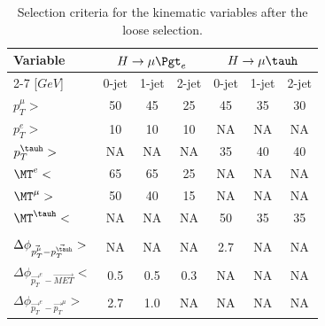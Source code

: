 \begin{table}[hbtp]
 \centering
 \caption{Selection criteria for the kinematic variables after the loose selection.}
  \label{tab:kinematicselection}
   \begin{tabular}{lccc|ccc} \hline
Variable &\multicolumn{3}{c|}{$H\rightarrow\mu\Pgt_{e}$ }                 &     \multicolumn{3}{c}{$H \rightarrow \mu \tauh$}
 \\ \cline{2-7}
      [$GeV$]                                   &  0-jet        & 1-jet       & 2-jet         &  0-jet         & 1-jet       & 2-jet  \\ \hline
$p_{T}^{\mu}>$                                &     50        &   45        &   25          &  45            & 35          &  30    \\
$p_{T}^{e}>$                                  &     10        &   10        &   10          &   NA            &  NA          &  NA      \\
$p_{T}^{\tauh}>$                               &     NA         &    NA        &    NA          &  35            & 40          &  40    \\
$\MT^{e}<$                                   &    65         &   65        &   25          &    NA           &   NA         &  NA      \\
$\MT^{\mu}>$                                 &    50         &   40        &   15          &    NA           &   NA         &  NA      \\
$\MT^{\tauh}<$                                &     NA         &    NA        &    NA          &  50            & 35          &   35   \\   \hline
      [radians]                               &                     &                \\  \hline
$\Delta \phi_{\vec{p_{T}^{\mu}}-\vec{p_{T}^{\tauh}}}>$   &     NA         &    NA        &    NA          &  2.7           &  NA          &  NA      \\
$\Delta \phi_{\vec{p_{T}}^{e}-\vec{MET}}<$             &    0.5        &   0.5       &   0.3         &    NA           &  NA          &  NA      \\
$\Delta \phi_{\vec{p_{T}}^{e}-\vec{p_{T}}^{\mu}}>$            &    2.7        &   1.0       &    NA          &    NA           &   NA         &  NA      \\  \hline

  \end{tabular}
\end{table}

